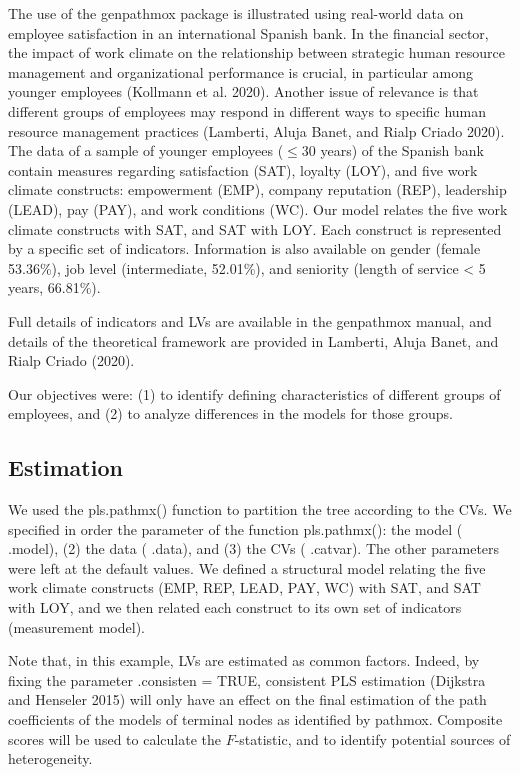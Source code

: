 The use of the genpathmox package is illustrated using real-world data
on employee satisfaction in an international Spanish bank. In the
financial sector, the impact of work climate on the relationship between
strategic human resource management and organizational performance is
crucial, in particular among younger employees (Kollmann et al. 2020). Another
issue of relevance is that different groups of employees may respond in
different ways to specific human resource management practices
(Lamberti, Aluja Banet, and Rialp Criado 2020). The data of a sample of younger employees
(\(\leq\)30 years) of the Spanish bank contain measures
regarding satisfaction (SAT), loyalty (LOY), and five work climate
constructs: empowerment (EMP), company reputation (REP), leadership
(LEAD), pay (PAY), and work conditions (WC). Our model relates the five
work climate constructs with SAT, and SAT with LOY. Each construct is
represented by a specific set of indicators. Information is also
available on gender (female 53.36\%), job level (intermediate, 52.01\%),
and seniority (length of service \textless{} 5 years, 66.81\%).

Full details of indicators and LVs are available in the genpathmox
manual, and details of the theoretical framework are provided in
Lamberti, Aluja Banet, and Rialp Criado (2020).

Our objectives were: (1) to identify defining characteristics of
different groups of employees, and (2) to analyze differences in the
models for those groups.

\hypertarget{estimation}{%
\subsection{Estimation}\label{estimation}}

We used the pls.pathmx() function to partition the tree according to the
CVs. We specified in order the parameter of the function pls.pathmx():
the model ( .model), (2) the data ( .data), and (3) the CVs ( .catvar).
The other parameters were left at the default values. We defined a
structural model relating the five work climate constructs (EMP, REP,
LEAD, PAY, WC) with SAT, and SAT with LOY, and we then related each
construct to its own set of indicators (measurement model).

Note that, in this example, LVs are estimated as common factors. Indeed,
by fixing the parameter .consisten = TRUE, consistent PLS estimation
(Dijkstra and Henseler 2015) will only have an effect on the final estimation of the
path coefficients of the models of terminal nodes as identified by
pathmox. Composite scores will be used to calculate the \(F\)-statistic,
and to identify potential sources of heterogeneity. ~

